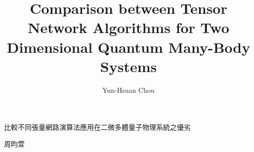 

\title{Comparison between Tensor Network Algorithms for Two Dimensional Quantum Many-Body Systems}{比較不同張量網路演算法應用在二微多體量子物理系統之優劣}
\author{Yun-Hsuan Chou}{周昀萱}

